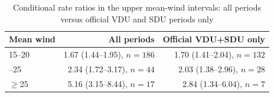 \begin{table}[H]
\centering
\small
\caption{Conditional rate ratios in the upper mean-wind intervals: all periods versus official VDU and SDU periods only}
\label{tab:traffic-scope}
\begin{tabular}{lrr}
\toprule
Mean wind & All periods & Official VDU+SDU only \\
\midrule
15--20 & 1.67 (1.44--1.95), $n=186$ & 1.70 (1.41--2.04), $n=132$ \\ \grayhline
20--25 & 2.34 (1.72--3.17), $n=44$ & 2.03 (1.38--2.96), $n=28$ \\ \grayhline
$\geq$25 & 5.16 (3.15--8.44), $n=17$ & 2.84 (1.34--6.04), $n=7$ \\
\bottomrule
\end{tabular}
\end{table}
